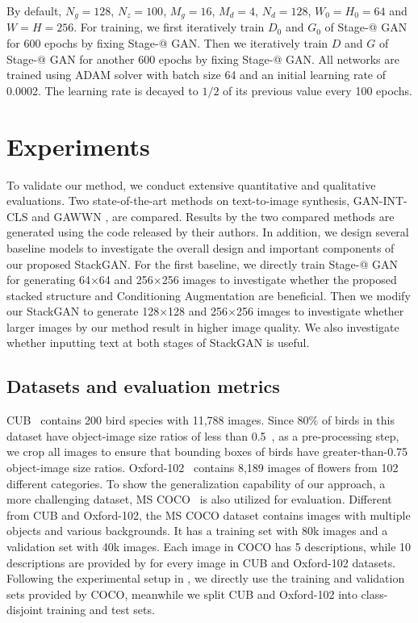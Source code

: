 By default, $N_g=128$,  $N_z=100$, $M_g=16$,  $M_d=4$, $N_d=128$,  $W_{0}=H_{0} = 64$ and $W=H=256$. For training, we first iteratively train $D_0$ and $G_0$ of Stage-\expandafter\@slowromancap{}@ GAN for 600 epochs by fixing Stage-\expandafter\@slowromancap{}@ GAN. Then we iteratively train $D$ and $G$ of Stage-\expandafter\@slowromancap{}@ GAN for another 600 epochs by fixing Stage-\expandafter\@slowromancap{}@ GAN. All networks are trained using ADAM solver with batch size 64 and an initial learning rate of 0.0002. The learning rate is decayed to $1/2$ of its previous value every 100 epochs. 

\section{Experiments}

To validate our method, we conduct extensive quantitative and qualitative evaluations. Two state-of-the-art methods on text-to-image synthesis, GAN-INT-CLS \cite{reed2016generative} and GAWWN \cite{reed2016learning}, are compared. Results by the two compared methods are generated using the code released by their authors. In addition, we design several baseline models to investigate the overall design and important components of our proposed StackGAN. For the first baseline, we directly train Stage-\expandafter\@slowromancap{}@ GAN for generating 64$\times$64 and 256$\times$256 images to investigate whether the proposed stacked structure and Conditioning Augmentation are beneficial. Then we modify our StackGAN to generate 128$\times$128 and 256$\times$256 images to investigate whether larger images by our method result in higher image quality. We also investigate whether inputting text at both stages of StackGAN is useful. 

\subsection{Datasets and evaluation metrics} 

CUB~\cite{WahCUB_200_2011} contains 200 bird species with 11,788 images. Since 80\% of birds in this dataset have object-image size ratios of less than 0.5~\cite{WahCUB_200_2011}, as a pre-processing step, we crop all images to ensure that bounding boxes of birds have greater-than-0.75 object-image size ratios. Oxford-102~\cite{Nilsback08} contains 8,189 images of flowers from 102 different categories. To show the generalization capability of our approach, a more challenging dataset, MS COCO~\cite{LinMBHPRDZ14} is also utilized for evaluation. Different from CUB and Oxford-102, the MS COCO dataset contains images with multiple objects and various backgrounds. It has a training set with 80k images and a validation set with 40k images. Each image in COCO has 5 descriptions, while 10 descriptions are provided by \cite{reed2016cvpr} for every image in CUB and Oxford-102 datasets. Following the experimental setup in \cite{reed2016generative}, we directly use the training and validation sets provided by COCO, meanwhile we split CUB and Oxford-102 into class-disjoint training and test sets. 


